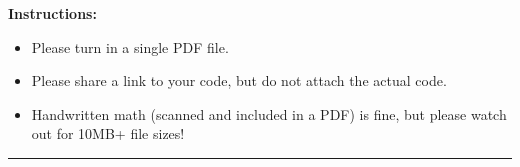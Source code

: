 \documentclass[11pt]{article}
\begin{document}
\renewcommand{\headrulewidth}{0.4pt}

{\bf Instructions:} 
\begin{itemize}[itemsep=-7pt]
	\item Please turn in a single PDF file. 
	\item Please share a link to your code, but do not attach the actual code. 
	\item Handwritten math (scanned and included in a PDF) is fine, but please watch out for 10MB+ file sizes!
\end{itemize}

\vspace{0.1in}\hrule
\end{document}

